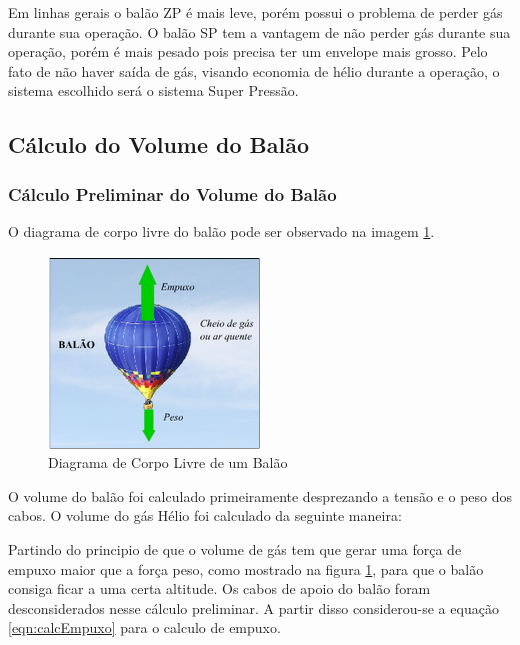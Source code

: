 	Em linhas gerais o balão ZP é mais leve, porém possui o problema de perder gás durante sua operação. O balão SP tem a vantagem de não perder gás durante sua operação, porém é mais pesado pois precisa ter um envelope mais grosso. Pelo fato de não haver saída de gás, visando economia de hélio durante a operação, o sistema escolhido será o sistema Super Pressão.



\subsection{Cálculo  do Volume do Balão} %
\label{sub:c_lculo_do_volume_do_bal_o}

	\subsubsection{Cálculo Preliminar do Volume do Balão}

	O diagrama de corpo livre do balão pode ser observado na imagem \ref{img:corpoLivreBalao}.
	\begin{figure}[H]
		\centering
		\includegraphics[width=0.5\textwidth]{figuras/corpoLivreBalao}
		\caption[Diagrama de Corpo Livre de um Balão]{Diagrama de Corpo Livre de um Balão~\cite{justino}}
		\label{img:corpoLivreBalao}
	\end{figure}

	O volume do balão foi calculado primeiramente desprezando a tensão e o peso dos cabos. 	O volume do gás Hélio foi calculado da seguinte maneira:

	Partindo do principio de que o volume de gás tem que gerar uma força de empuxo maior que a força peso, como mostrado na figura \ref{img:corpoLivreBalao}, para que o balão consiga ficar a uma certa altitude. Os cabos de apoio do balão foram desconsiderados nesse cálculo preliminar. A partir disso considerou-se a equação \eqref{eqn:calcEmpuxo} para o calculo de empuxo.

